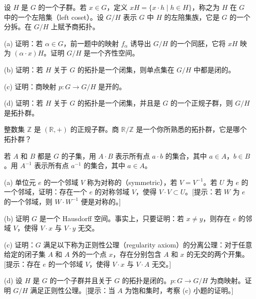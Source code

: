 \documentclass[../../main.tex]{subfiles}
\begin{document}
\begin{exercise}\label{exercise:ch02-附加习题-5}
设 $H$ 是 $G$ 的一个子群。若 $x \in G$，定义 $xH = \{x \cdot h \mid h \in H\}$，称之为 $H$ 在 $G$ 中的一个左陪集（left coset）。设 $G/H$ 表示 $G$ 中 $H$ 的左陪集族，它是 $G$ 的一个分拆。在 $G/H$ 上赋予商拓扑。

(a) 证明：若 $\alpha \in G$，前一题中的映射 $f_{\alpha}$ 诱导出 $G/H$ 的一个同胚，它将 $xH$ 映为 $(\alpha \cdot x)H$。证明 $G/H$ 是一个齐性空间。

(b) 证明：若 $H$ 关于 $G$ 的拓扑是一个闭集，则单点集在 $G/H$ 中都是闭的。

(c) 证明：商映射 $p: G \rightarrow G/H$ 是开的。

(d) 证明：若 $H$ 关于 $G$ 的拓扑是一个闭集，并且是 $G$ 的一个正规子群，则 $G/H$ 是拓扑群。
\end{exercise}

\begin{exercise}\label{exercise:ch02-附加习题-6}
整数集 $\mathbb{Z}$ 是 $(\mathbb{R}, +)$ 的正规子群。商 $\mathbb{R}/\mathbb{Z}$ 是一个你所熟悉的拓扑群，它是哪个拓扑群？
\end{exercise}

\begin{exercise}\label{exercise:ch02-附加习题-7}
若 $A$ 和 $B$ 都是 $G$ 的子集，用 $A \cdot B$ 表示所有点 $a \cdot b$ 的集合，其中 $a \in A$，$b \in B$。用 $A^{-1}$ 表示所有点 $a^{-1}$ 的集合，其中 $a \in A$。

(a) 单位元 $e$ 的一个邻域 $V$ 称为对称的（symmetric），若 $V = V^{-1}$。若 $U$ 为 $e$ 的一个邻域，证明：存在一个 $e$ 的对称邻域 $V$，使得 $V \cdot V \subset U$。[提示：若 $W$ 为 $e$ 的一个邻域，则 $W \cdot W^{-1}$ 便是对称的。]

(b) 证明 $G$ 是一个 Hausdorff 空间。事实上，只要证明：若 $x \neq y$，则存在 $e$ 的邻域 $V$，使得 $V \cdot x$ 与 $V \cdot y$ 无交。

(c) 证明：$G$ 满足以下称为正则性公理（regularity axiom）的分离公理：对于任意给定的闭子集 $A$ 和 $A$ 外的一个点 $x$，存在分别包含 $A$ 和 $x$ 的无交的两个开集。[提示：存在 $e$ 的一个邻域 $V$，使得 $V \cdot x$ 与 $V \cdot A$ 无交。]

(d) 设 $H$ 是 $G$ 的一个子群并且关于 $G$ 的拓扑是闭的。$p: G \rightarrow G/H$ 为商映射。证明 $G/H$ 满足正则性公理。[提示：当 $A$ 为饱和集时，考察 (c) 小题的证明。]
\end{exercise}
\end{document}
